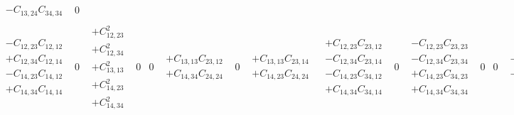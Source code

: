 \documentclass[pra,nofootinbib]{revtex4-1}
\newcommand{\C}[2]{C_{{#1},{#2}}}
\begin{document}
\begin{eqnarray}
\begin{array}{cccccccccccccccc}
\begin{array}{c}
     - \C{13}{24}\C{34}{34}
     \end{array} &
     0 \\
     \begin{array}{c}
     - \C{12}{23}\C{12}{12} \\
     + \C{12}{34}\C{12}{14} \\
     - \C{14}{23}\C{14}{12} \\
     + \C{14}{34}\C{14}{14}
     \end{array} &
     0 &
     \begin{array}{c}
     + \C{12}{23}^2 \\
     + \C{12}{34}^2 \\
     + \C{13}{13}^2 \\
     + \C{14}{23}^2 \\
     + \C{14}{34}^2
     \end{array} &
     0 &
     0 &
     \begin{array}{c}
     + \C{13}{13}\C{23}{12} \\
     + \C{14}{34}\C{24}{24}
     \end{array} &
     0 &
     \begin{array}{c}
     + \C{13}{13}\C{23}{14} \\
     + \C{14}{23}\C{24}{24}
     \end{array} &
     \begin{array}{c}
     + \C{12}{23}\C{23}{12} \\
     - \C{12}{34}\C{23}{14} \\
     - \C{14}{23}\C{34}{12} \\
     + \C{14}{34}\C{34}{14}
     \end{array} &
     0 &
     \begin{array}{c}
     - \C{12}{23}\C{23}{23} \\
     - \C{12}{34}\C{23}{34} \\
     + \C{14}{23}\C{34}{23} \\
     + \C{14}{34}\C{34}{34}
     \end{array} &
     0 &
     0 &
     \begin{array}{c}
     - \C{12}{34}\C{24}{24} \\
     - \C{13}{13}\C{34}{12}
     \end{array} &
     0 &
     \begin{array}{c}
     - \C{12}{23}\C{24}{24} \\
     - \C{13}{13}\C{34}{14}
     \end{array} \\

\end{array}
\end{eqnarray}
\end{document}
